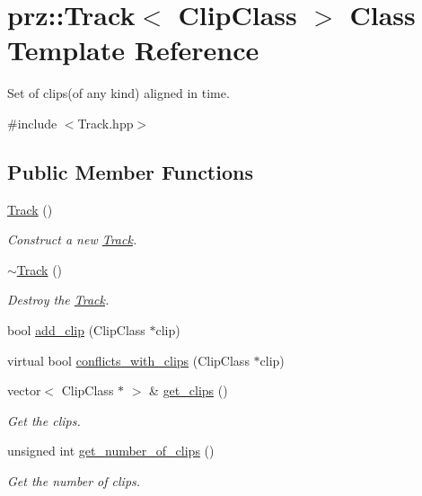 \hypertarget{classprz_1_1_track}{}\section{prz\+::Track$<$ Clip\+Class $>$ Class Template Reference}
\label{classprz_1_1_track}


Set of clips(of any kind) aligned in time.  




{\ttfamily \#include $<$Track.\+hpp$>$}

\subsection*{Public Member Functions}
\begin{DoxyCompactItemize}
\item 
\mbox{\hyperlink{classprz_1_1_track_a65d3d9efb5a6640f94c5f22cacadd625}{Track}} ()
\begin{DoxyCompactList}\small\item\em Construct a new \mbox{\hyperlink{classprz_1_1_track}{Track}}. \end{DoxyCompactList}\item 
\mbox{\hyperlink{classprz_1_1_track_a84507a3e2e1cbb97d21298e73b7a24e3}{$\sim$\+Track}} ()
\begin{DoxyCompactList}\small\item\em Destroy the \mbox{\hyperlink{classprz_1_1_track}{Track}}. \end{DoxyCompactList}\item 
bool \mbox{\hyperlink{classprz_1_1_track_aa818d00358690b7dd76ae6e1eb788838}{add\+\_\+clip}} (Clip\+Class $\ast$clip)
\item 
virtual bool \mbox{\hyperlink{classprz_1_1_track_a2f2314165a05c4748d684fca42b2f76a}{conflicts\+\_\+with\+\_\+clips}} (Clip\+Class $\ast$clip)
\item 
vector$<$ Clip\+Class $\ast$ $>$ \& \mbox{\hyperlink{classprz_1_1_track_a54eb44634d26680f1851077e64991419}{get\+\_\+clips}} ()
\begin{DoxyCompactList}\small\item\em Get the clips. \end{DoxyCompactList}\item 
unsigned int \mbox{\hyperlink{classprz_1_1_track_a776b6d37978d945f406fc4922981a2a1}{get\+\_\+number\+\_\+of\+\_\+clips}} ()
\begin{DoxyCompactList}\small\item\em Get the number of clips. \end{DoxyCompactList}\end{DoxyCompactItemize}


